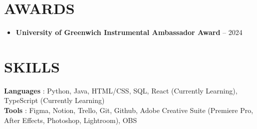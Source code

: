 \documentclass[letterpaper,11pt]{article}
\newcommand{\resumeItem}[1]{
  \item\small{
    {#1 \vspace{-1pt}}
  }
}
\newcommand{\resumeSubItem}[1]{\resumeItem{#1}\vspace{-4pt}}
\newcommand{\resumeSubHeadingListStart}{\begin{itemize}[leftmargin=0in, label={}]}
\newcommand{\resumeSubHeadingListEnd}{\end{itemize}}
\begin{document}
\section{AWARDS}
  \resumeSubHeadingListStart
    \resumeSubItem{\textbf{University of Greenwich Instrumental Ambassador Award} -- 2024}
  \resumeSubHeadingListEnd


%
\section{SKILLS}
 \begin{itemize}[leftmargin=0in, label={}]
    \small{\item{
     \textbf{Languages} {: Python, Java, HTML/CSS, SQL,  React (Currently Learning), TypeScript (Currently Learning)}\vspace{2pt} \\
     \textbf{Tools}     {: Figma, Notion, Trello, Git, Github, Adobe Creative Suite (Premiere Pro, After Effects, Photoshop, Lightroom), OBS}
    }}
 \end{itemize}


\end{document}
